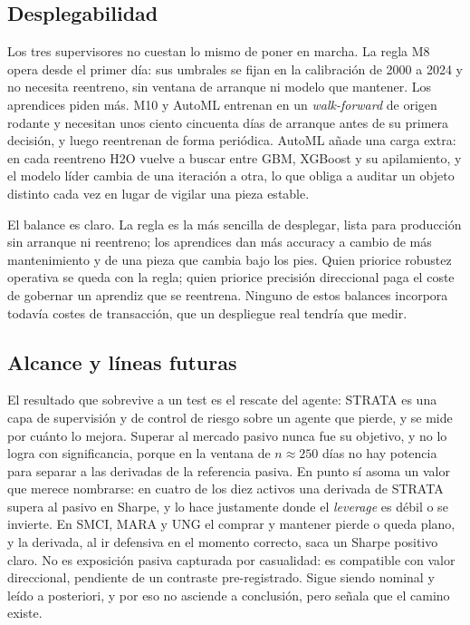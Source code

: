 \subsection{Desplegabilidad}
\label{sec:mp-lim-despliegue}

Los tres supervisores no cuestan lo mismo de poner en marcha. La regla M8 opera desde el primer día: sus umbrales se fijan en la calibración de 2000 a 2024 y no necesita reentreno, sin ventana de arranque ni modelo que mantener. Los aprendices piden más. M10 y AutoML entrenan en un \emph{walk-forward} de origen rodante y necesitan unos ciento cincuenta días de arranque antes de su primera decisión, y luego reentrenan de forma periódica. AutoML añade una carga extra: en cada reentreno H2O vuelve a buscar entre GBM, XGBoost y su apilamiento, y el modelo líder cambia de una iteración a otra, lo que obliga a auditar un objeto distinto cada vez en lugar de vigilar una pieza estable.

El balance es claro. La regla es la más sencilla de desplegar, lista para producción sin arranque ni reentreno; los aprendices dan más accuracy a cambio de más mantenimiento y de una pieza que cambia bajo los pies. Quien priorice robustez operativa se queda con la regla; quien priorice precisión direccional paga el coste de gobernar un aprendiz que se reentrena. Ninguno de estos balances incorpora todavía costes de transacción, que un despliegue real tendría que medir.

\subsection{Alcance y líneas futuras}
\label{sec:mp-lim-futuro}

El resultado que sobrevive a un test es el rescate del agente: STRATA es una capa de supervisión y de control de riesgo sobre un agente que pierde, y se mide por cuánto lo mejora. Superar al mercado pasivo nunca fue su objetivo, y no lo logra con significancia, porque en la ventana de $n \approx 250$ días no hay potencia para separar a las derivadas de la referencia pasiva. En punto sí asoma un valor que merece nombrarse: en cuatro de los diez activos una derivada de STRATA supera al pasivo en Sharpe, y lo hace justamente donde el \emph{leverage} es débil o se invierte. En SMCI, MARA y UNG el comprar y mantener pierde o queda plano, y la derivada, al ir defensiva en el momento correcto, saca un Sharpe positivo claro. No es exposición pasiva capturada por casualidad: es compatible con valor direccional, pendiente de un contraste pre-registrado. Sigue siendo nominal y leído a posteriori, y por eso no asciende a conclusión, pero señala que el camino existe.

